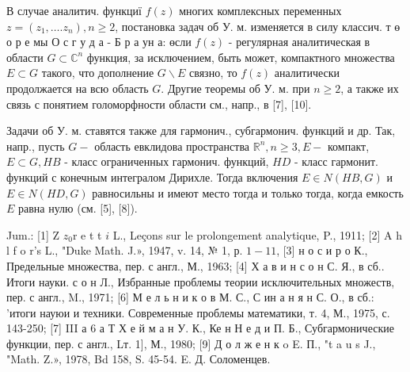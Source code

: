 \documentclass[10pt]{article}
\begin{document}
В случае аналитич. функциї $f(z)$ многих комплексных переменных $z=\left(z_{1}, \ldots . z_{n}\right), n \geqslant 2$, постановка задач об У. м. изменяется в силу классич. т ө о р е мы О с г у д а - Б р а ун а: өсли $f(z)$ - регулярная аналитическая в области $G \subset \mathbb{C}^{n}$ функция, за исключением, быть может, компактного множества $E \subset G$ такого, что дополнение $G \backslash E$ связно, то $f(z)$ аналитически продолжается на всю область $G$. Другие теоремы об У. м. при $n \geqslant 2$, а также их связь с понятием голоморфности области см., напр., в [7], [10].



Задачи об У. м. ставятся также для гармонич., субгармонич. функций и др. Так, напр., пусть $G-$ область евклидова пространства $\mathbb{R}^{n}, n \geqslant 3, E-$ компакт, $E \subset G, H B$ - класс ограниченных гармонич. функций, $H D$ - класс гармонит. функций с конечным интегралом Дирихле. Тогда включения $E \in N(H B, G)$ и $E \in N(H D, G)$ равносильны и имеют место тогда и только тогда, когда емкость $E$ равна нулю (см. [5], [8]).



Jum.: [1] Z $z_{0} \mathrm{r}$ e t t $i$ L., Leçons sur le prolongement analytique, P., 1911; [2] A h l f o r's L., "Duke Math. J.», 1947, v. 14, № 1, р. $1-11$, [3] н о с и р о К., Предельные множества, пер. с англ., М., 1963; [4] Х а в и н с о н С. Я., в сб.. Итоги науки. с о н Л., Избранные проблемы теории исключительных множеств, пер. с англ., M., 1971; [6] М е л ь н и к о в М. С., С ин а н я н С. О., в сб.: 'итоги науюи и техники. Современные проблемы математики, т. 4, М., 1975, с. 143-250; [7] III а 6 а Т Х е й м а н У. К., Ке н Н е д и П. Б., Субгармонические функции, пер. с англ., Lт. 1], М., 1980; [9] Д о л ж е н к o E. П., "t a u s J., "Math. Z.», 1978, Bd 158, S. 45-54. E. Д. Соломенцев.
\end{document}
